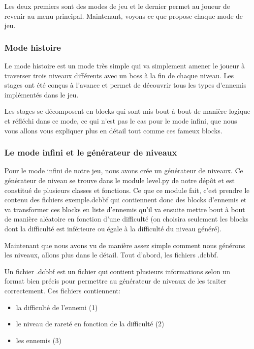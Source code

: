 \documentclass{article}
\begin{document}
Les deux premiers sont des modes de jeu et le dernier permet au joueur de
revenir au menu principal. Maintenant, voyons ce que propose chaque mode de jeu.

\subsubsection{Mode histoire}

Le mode histoire est un mode très simple qui va simplement amener le joueur à
traverser trois niveaux différents avec un boss à la fin de chaque niveau. Les
stages ont été conçus à l'avance et permet de découvrir tous les types d'ennemis
implémentés dans le jeu. \newline

Les stages se décomposent en blocks qui sont mis bout à bout de manière logique
et réfléchi dans ce mode, ce qui n'est pas le cas pour le mode infini, que nous
vous allons vous expliquer plus en détail tout comme ces fameux blocks.

\subsubsection{Le mode infini et le générateur de niveaux}

Pour le mode infini de notre jeu, nous avons crée un générateur de niveaux. Ce
générateur de niveau se trouve dans le module level.py de notre dépôt et est
constitué de plusieurs classes et fonctions. Ce que ce module fait, c'est
prendre le contenu des fichiers exemple.dcbbf qui contiennent donc des blocks
d'ennemis et va transformer ces blocks en liste d'ennemis qu'il va ensuite
mettre bout à bout de manière aléatoire en fonction d'une difficulté (on
choisira seulement les blocks dont la difficulté est inférieure ou égale à la
difficulté du niveau généré). \newline

Maintenant que nous avons vu de manière assez simple comment nous générons les
niveaux, allons plus dans le détail. Tout d'abord, les fichiers .dcbbf. \newline

Un fichier .dcbbf est un fichier qui contient plusieurs informations selon un
format bien précis pour permettre au générateur de niveaux de les traiter
correctement. Ces fichiers contiennent: \newline

\begin{itemize}
	\item la difficulté de l'ennemi (1)
	\item le niveau de rareté en fonction de la difficulté (2)
	\item les ennemis (3) \newline
\end{itemize}
\end{document}
